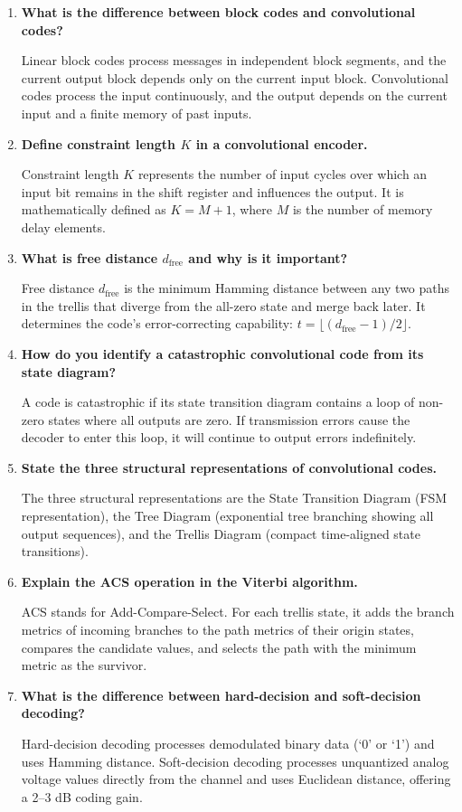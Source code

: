 \documentclass[12pt,a4paper]{article}
\newcommand{\Q}[1]{\textbf{#1}\par\noindent\ignorespaces}
\begin{document}
\begin{tcolorbox}[exambox, title={\textbf{Frequently Asked / Viva Questions}}]
\begin{enumerate}[topsep=0pt, label=\textbf{Q\arabic*.}, itemsep=5pt]
  \item \Q{What is the difference between block codes and convolutional codes?}
    Linear block codes process messages in independent block segments, and the current output block depends only on the current input block. Convolutional codes process the input continuously, and the output depends on the current input and a finite memory of past inputs.
  \item \Q{Define constraint length $K$ in a convolutional encoder.}
    Constraint length $K$ represents the number of input cycles over which an input bit remains in the shift register and influences the output. It is mathematically defined as $K = M + 1$, where $M$ is the number of memory delay elements.
  \item \Q{What is free distance $d_{\text{free}}$ and why is it important?}
    Free distance $d_{\text{free}}$ is the minimum Hamming distance between any two paths in the trellis that diverge from the all-zero state and merge back later. It determines the code's error-correcting capability: $t = \lfloor(d_{\text{free}}-1)/2\rfloor$.
  \item \Q{How do you identify a catastrophic convolutional code from its state diagram?}
    A code is catastrophic if its state transition diagram contains a loop of non-zero states where all outputs are zero. If transmission errors cause the decoder to enter this loop, it will continue to output errors indefinitely.
  \item \Q{State the three structural representations of convolutional codes.}
    The three structural representations are the State Transition Diagram (FSM representation), the Tree Diagram (exponential tree branching showing all output sequences), and the Trellis Diagram (compact time-aligned state transitions).
  \item \Q{Explain the ACS operation in the Viterbi algorithm.}
    ACS stands for Add-Compare-Select. For each trellis state, it adds the branch metrics of incoming branches to the path metrics of their origin states, compares the candidate values, and selects the path with the minimum metric as the survivor.
  \item \Q{What is the difference between hard-decision and soft-decision decoding?}
    Hard-decision decoding processes demodulated binary data (`0' or `1') and uses Hamming distance. Soft-decision decoding processes unquantized analog voltage values directly from the channel and uses Euclidean distance, offering a 2--3 dB coding gain.

\end{enumerate}
\end{tcolorbox}
\end{document}
